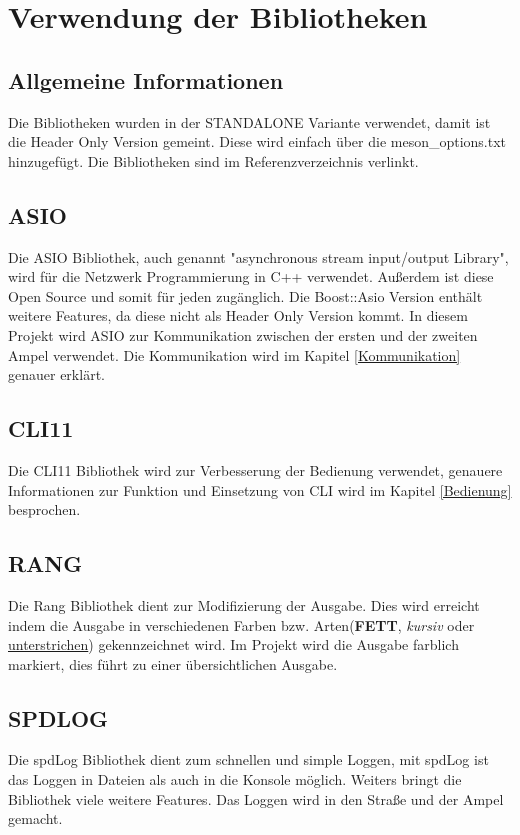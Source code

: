 \documentclass[12pt, oneside]{article}
\begin{document}
\section{Verwendung der Bibliotheken}
\subsection{Allgemeine Informationen}
Die Bibliotheken wurden in der STANDALONE Variante verwendet, damit ist die Header Only Version gemeint. Diese wird einfach über die meson\_options.txt hinzugefügt. Die Bibliotheken sind im Referenzverzeichnis verlinkt.

\subsection{ASIO}
 Die ASIO Bibliothek, auch genannt "asynchronous stream input/output Library", wird für die Netzwerk Programmierung in C++ verwendet. Außerdem ist diese Open Source und somit für jeden zugänglich. Die Boost::Asio Version enthält weitere Features, da diese nicht als Header Only Version kommt. In diesem Projekt wird ASIO zur Kommunikation zwischen der ersten und der zweiten Ampel verwendet. Die Kommunikation wird im Kapitel \ref{Kommunikation} genauer erklärt.  \cite{ASIO}
 
\subsection{CLI11}
Die CLI11 Bibliothek wird zur Verbesserung der Bedienung verwendet, genauere Informationen zur Funktion und Einsetzung von CLI wird im Kapitel \ref{Bedienung} besprochen. \cite{CLI11}

\subsection{RANG}
Die Rang Bibliothek dient zur Modifizierung der Ausgabe. Dies wird erreicht indem die Ausgabe in verschiedenen Farben bzw. Arten(\textbf{FETT}, \textit{kursiv} oder \underline{unterstrichen}) gekennzeichnet wird. Im Projekt wird die Ausgabe farblich markiert, dies führt zu einer übersichtlichen Ausgabe.\cite{Rang}

\subsection{SPDLOG}
Die spdLog Bibliothek dient zum schnellen und simple Loggen, mit spdLog ist das Loggen in Dateien als auch in die Konsole möglich. Weiters bringt die Bibliothek viele weitere Features. Das Loggen wird in den Straße und der Ampel gemacht.\cite{spdlog}
\end{document}

